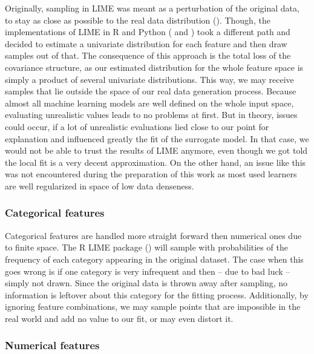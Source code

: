 \documentclass[
]{krantz}
\begin{document}
Originally, sampling in LIME was meant as a perturbation of the original data, to stay as close as possible to the real data distribution (\citet{ribeiro2016should}).
Though, the implementations of LIME in R and Python (\citet{thomasp85lime} and \citet{marcotcrlime}) took a different path and decided to estimate a univariate distribution for each feature and then draw samples out of that.
The consequence of this approach is the total loss of the covariance structure, as our estimated distribution for the whole feature space is simply a product of several univariate distributions.
This way, we may receive samples that lie outside the space of our real data generation process.
Because almost all machine learning models are well defined on the whole input space, evaluating unrealistic values leads to no problems at first.
But in theory, issues could occur, if a lot of unrealistic evaluations lied close to our point for explanation and influenced greatly the fit of the surrogate model.
In that case, we would not be able to trust the results of LIME anymore, even though we got told the local fit is a very decent approximation.
On the other hand, an issue like this was not encountered during the preparation of this work as most used learners are well regularized in space of low data denseness.

\hypertarget{categorical-features-1}{%
\subsubsection{Categorical features}\label{categorical-features-1}}

Categorical features are handled more straight forward then numerical ones due to finite space.
The R LIME package (\citet{thomasp85lime}) will sample with probabilities of the frequency of each category appearing in the original dataset.
The case when this goes wrong is if one category is very infrequent and then -- due to bad luck -- simply not drawn.
Since the original data is thrown away after sampling, no information is leftover about this category for the fitting process.
Additionally, by ignoring feature combinations, we may sample points that are impossible in the real world and add no value to our fit, or may even distort it.

\hypertarget{numerical-features}{%
\subsubsection{Numerical features}\label{numerical-features}}
\end{document}

